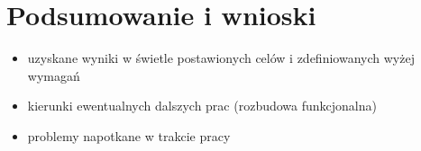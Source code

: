 \chapter{Podsumowanie i wnioski}
 {
  \begin{itemize}
      \item uzyskane wyniki w świetle postawionych celów
            i zdefiniowanych wyżej wymagań
      \item kierunki ewentualnych dalszych prac (rozbudowa funkcjonalna)
      \item problemy napotkane w trakcie pracy
  \end{itemize}
 }